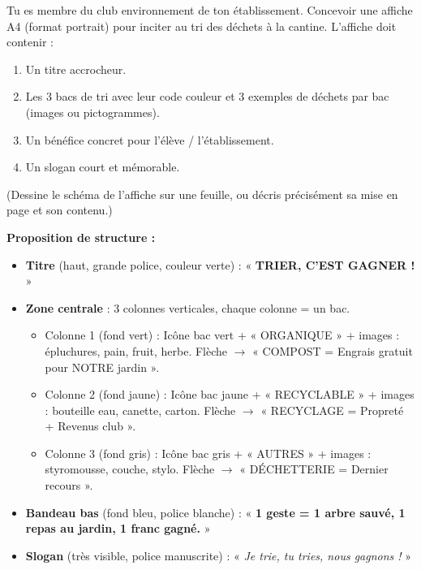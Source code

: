 \documentclass[11pt]{article}
\begin{document}
\begin{exercice}
Tu es membre du club environnement de ton établissement. Concevoir une affiche A4 (format portrait) pour inciter au tri des déchets à la cantine. L'affiche doit contenir :
\begin{enumerate}
\item Un titre accrocheur.
\item Les 3 bacs de tri avec leur code couleur et 3 exemples de déchets par bac (images ou pictogrammes).
\item Un bénéfice concret pour l'élève / l'établissement.
\item Un slogan court et mémorable.
\end{enumerate}
(Dessine le schéma de l'affiche sur une feuille, ou décris précisément sa mise en page et son contenu.)
\end{exercice}

\begin{corrige}
\textbf{Proposition de structure :}
\begin{itemize}
\item \textbf{Titre} (haut, grande police, couleur verte) : « \textbf{TRIER, C'EST GAGNER !} »
\item \textbf{Zone centrale} : 3 colonnes verticales, chaque colonne = un bac.
\begin{itemize}
\item Colonne 1 (fond vert) : Icône bac vert + « ORGANIQUE » + images : épluchures, pain, fruit, herbe. Flèche $\rightarrow$ « COMPOST = Engrais gratuit pour NOTRE jardin ».
\item Colonne 2 (fond jaune) : Icône bac jaune + « RECYCLABLE » + images : bouteille eau, canette, carton. Flèche $\rightarrow$ « RECYCLAGE = Propreté + Revenus club ».
\item Colonne 3 (fond gris) : Icône bac gris + « AUTRES » + images : styromousse, couche, stylo. Flèche $\rightarrow$ « DÉCHETTERIE = Dernier recours ».
\end{itemize}
\item \textbf{Bandeau bas} (fond bleu, police blanche) : « \textbf{1 geste = 1 arbre sauvé, 1 repas au jardin, 1 franc gagné.} »
\item \textbf{Slogan} (très visible, police manuscrite) : « \emph{Je trie, tu tries, nous gagnons !} »
\end{itemize}
\end{corrige}
\end{document}
